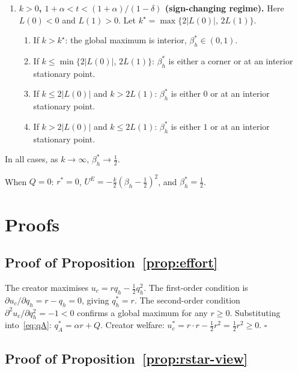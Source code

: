\documentclass[mnsc,nonblindrev]{informs3_NoOR}
\begin{document}
\begin{proposition}
\begin{enumerate}
\item[\textup{(iv)}] \textbf{$k > 0$, $1+\alpha < t < (1+\alpha)/(1-\delta)$ (sign-changing regime).} Here $L(0) < 0$ and $L(1) > 0$. Let $k^{\star} = \max\{2|L(0)|,\, 2L(1)\}$.
\begin{enumerate}[label=(\alph*)]
\item If $k > k^{\star}$: the global maximum is interior, $\beta_h^* \in (0,1)$.
\item If $k \leq \min\{2|L(0)|,\, 2L(1)\}$:  $\beta_h^*$ is either a corner or at an interior stationary point.
\item If $k \leq 2|L(0)|$ and $k > 2L(1)$: $\beta_h^*$ is either $0$ or at an interior stationary point.
\item If $k > 2|L(0)|$ and $k \leq 2L(1)$: $\beta_h^*$ is either $1$ or at an interior stationary point.
\end{enumerate}
\end{enumerate}
 
In all cases, as $k \to \infty$, $\beta_h^* \to \frac{1}{2}$.
 
When $Q = 0$: $r^* = 0$, $U^E = -\frac{k}{2}(\beta_h - \frac{1}{2})^2$, and $\beta_h^* = \frac{1}{2}$.
\end{proposition} 
 


 
\appendix
\section{Proofs}\label{app:proofs}
 
\subsection*{Proof of Proposition~\ref{prop:effort}}
 
The creator maximises $u_c = rq_h - \frac{1}{2}q_h^2$. The first-order condition is $\partial u_c/\partial q_h = r - q_h = 0$, giving $q_h^* = r$. The second-order condition $\partial^2 u_c/\partial q_h^2 = -1 < 0$ confirms a global maximum for any $r \geq 0$. Substituting into~\eqref{eq:qA}: $q_A^* = \alpha r + Q$. Creator welfare: $u_c^* = r \cdot r - \frac{1}{2}r^2 = \frac{1}{2}r^2 \geq 0$. \hfill$\square$
 
\subsection*{Proof of Proposition~\ref{prop:rstar-view}}
 
\end{document}
